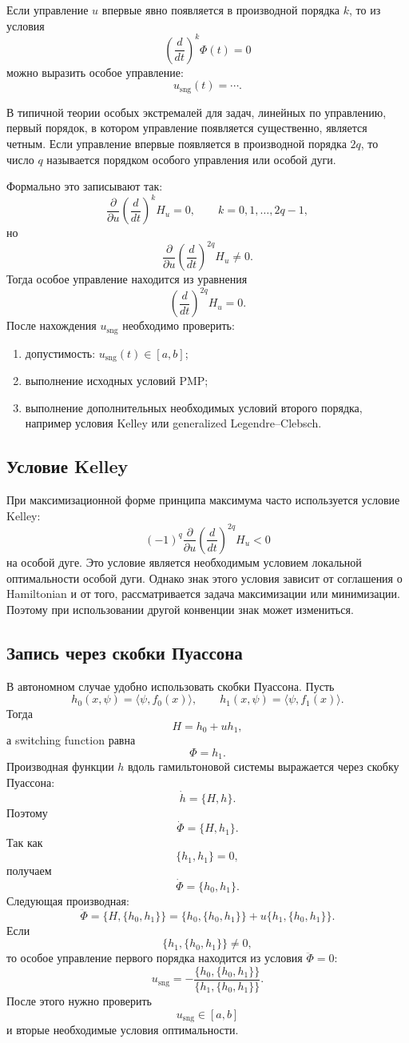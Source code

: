 \documentclass[12pt,a4paper]{article}
\newcommand{\sng}{\mathrm{sng}}
\begin{document}
Если управление $u$ впервые явно появляется в производной порядка $k$, то из условия
\[
\left(\frac{d}{dt}\right)^k\Phi(t)=0
\]
можно выразить особое управление:
\[
u_{\sng}(t)=\cdots.
\]

В типичной теории особых экстремалей для задач, линейных по управлению, первый порядок, в котором управление появляется существенно, является четным. Если управление впервые появляется в производной порядка $2q$, то число $q$ называется порядком особого управления или особой дуги.

Формально это записывают так:
\[
\frac{\partial}{\partial u}
\left(\frac{d}{dt}\right)^k H_u=0,
\qquad k=0,1,\ldots,2q-1,
\]
но
\[
\frac{\partial}{\partial u}
\left(\frac{d}{dt}\right)^{2q}H_u\ne0.
\]
Тогда особое управление находится из уравнения
\[
\left(\frac{d}{dt}\right)^{2q}H_u=0.
\]
После нахождения $u_{\sng}$ необходимо проверить:
\begin{enumerate}
    \item допустимость: $u_{\sng}(t)\in[a,b]$;
    \item выполнение исходных условий PMP;
    \item выполнение дополнительных необходимых условий второго порядка, например условия Kelley или generalized Legendre--Clebsch.
\end{enumerate}

\subsection*{Условие Kelley}
При максимизационной форме принципа максимума часто используется условие Kelley:
\[
(-1)^q
\frac{\partial}{\partial u}
\left(\frac{d}{dt}\right)^{2q}H_u
<0
\]
на особой дуге. Это условие является необходимым условием локальной оптимальности особой дуги. Однако знак этого условия зависит от соглашения о Hamiltonian и от того, рассматривается задача максимизации или минимизации. Поэтому при использовании другой конвенции знак может измениться.

\subsection*{Запись через скобки Пуассона}
В автономном случае удобно использовать скобки Пуассона. Пусть
\[
h_0(x,\psi)=\langle \psi,f_0(x)\rangle,
\qquad
h_1(x,\psi)=\langle \psi,f_1(x)\rangle.
\]
Тогда
\[
H=h_0+u h_1,
\]
а switching function равна
\[
\Phi=h_1.
\]
Производная функции $h$ вдоль гамильтоновой системы выражается через скобку Пуассона:
\[
\dot h=\{H,h\}.
\]
Поэтому
\[
\dot\Phi=\{H,h_1\}.
\]
Так как
\[
\{h_1,h_1\}=0,
\]
получаем
\[
\dot\Phi=\{h_0,h_1\}.
\]
Следующая производная:
\[
\ddot\Phi
=
\{H,\{h_0,h_1\}\}
=
\{h_0,\{h_0,h_1\}\}
+
u\{h_1,\{h_0,h_1\}\}.
\]
Если
\[
\{h_1,\{h_0,h_1\}\}\ne0,
\]
то особое управление первого порядка находится из условия $\ddot\Phi=0$:
\[
u_{\sng}
=
-
\frac{\{h_0,\{h_0,h_1\}\}}
{\{h_1,\{h_0,h_1\}\}}.
\]
После этого нужно проверить
\[
u_{\sng}\in[a,b]
\]
и вторые необходимые условия оптимальности.
\end{document}
